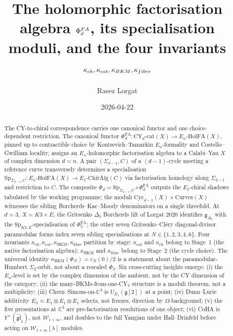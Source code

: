 \documentclass[11pt]{amsart}
\title{The holomorphic factorisation algebra $\PhiFA_d$, its
specialisation moduli, and the four invariants
$\kch,\kcat,\kBKM,\kfib$}
\author{Raeez Lorgat}
\date{2026-04-22}
\providecommand{\C}{\mathbb{C}}
\providecommand{\g}{\mathfrak{g}}
\providecommand{\gDelta}{\mathfrak{g}_{\Delta_5}}
\providecommand{\gghone}{\widehat{\mathfrak{gl}}_1}
\providecommand{\Winf}{\mathcal{W}_{1+\infty}}
\providecommand{\HolFA}{\mathrm{HolFA}}
\providecommand{\ChirAlg}{\mathrm{ChirAlg}}
\providecommand{\Sp}{\mathrm{Sp}}
\providecommand{\Cyc}{\mathrm{Cyc}}
\providecommand{\Yp}{Y^{+}}
\providecommand{\Eone}{E_1}
\providecommand{\Ethree}{E_3}
\providecommand{\En}{E_n}
\providecommand{\kch}{\kappa_{\mathrm{ch}}}
\providecommand{\kcat}{\kappa_{\mathrm{cat}}}
\providecommand{\kBKM}{\kappa_{\mathrm{BKM}}}
\providecommand{\kfib}{\kappa_{\mathrm{fibre}}}
\providecommand{\Phifun}{\Phi}
\providecommand{\PhiFA}{\Phi^{\mathrm{FA}}}
\theoremstyle{plain}
\theoremstyle{definition}
\theoremstyle{remark}
\begin{document}
\maketitle

\begin{abstract}
The CY-to-chiral correspondence carries one canonical functor and one
choice-dependent restriction. The canonical functor
$\PhiFA_d:\mathrm{CY}_d\text{-cat}(X)\to\En\text{-}\HolFA(X)$, pinned up
to contractible choice by Kontsevich--Tamarkin $\En$-formality and
Costello--Gwilliam locality, assigns an $\En$-holomorphic factorisation
algebra to a Calabi--Yau $X$ of complex dimension $d=n$. A pair
$(\Sigma_{d-1}, C)$ of a $(d-1)$-cycle meeting a reference curve
transversely determines a specialisation
$\Sp_{\Sigma_{d-1},C}:\En\text{-}\HolFA(X)\to\Eone\text{-}\ChirAlg(C)$
via factorisation homology along $\Sigma_{d-1}$ and restriction to
$C$. The composite $\Phifun_d = \Sp_{\Sigma_{d-1},C}\circ\PhiFA_d$
outputs the $\Eone$-chiral shadows tabulated by the working programme;
the moduli $\Cyc_{d-1}(X)\times\mathrm{Curves}(X)$ witnesses the
sibling Borcherds--Kac--Moody denominators on a single threefold. At
$d=3,\, X=K3\times E$, the Gritsenko $\Delta_5$ Borcherds lift of
Lorgat 2020 identifies $\gDelta$ with the $\Sp_{K3,E}$-specialisation
of $\PhiFA_3$; the other seven Gritsenko--Cl\'ery diagonal-divisor
paramodular forms index seven sibling specialisations at
$N\in\{1,2,3,4,6\}$. Four invariants $\kch,\kcat,\kBKM,\kfib$
partition by stage: $\kcat$ and $\kch$ belong to Stage~1 (the native
factorisation algebra); $\kBKM$ and $\kfib$ belong to Stage~2 (the
cycle choice).
The universal identity
$\kBKM(\Phi_N) = c_N(0)/2$ is a statement about the
paramodular-Humbert $\Sigma_2$-orbit, not about a rescaled $\Phi_3$.
Six cross-cutting insights emerge: (i) the $\En$-level is set by the
complex dimension of the ambient, not by the CY dimension of the
category; (ii) the many-BKMs-from-one-CY$_3$ structure is a moduli
theorem, not a multiplicity; (iii) Chern--Simons-on-$\C^3$ is
$U_{\Ethree}(\g[2])$ at a point; (iv) Dunn--Lurie additivity
$\Ethree\simeq\Eone\otimes\Eone\otimes\Eone$ selects, not freezes,
direction by $\Omega$-background; (v) the five presentations at $\C^3$
are pre-factorisation resolutions of one object; (vi) CoHA is
$\Yp(\gghone)$, not $\Winf$, and doubles to the full Yangian under
Hall--Drinfeld before acting on $\Winf[\lambda]$ modules.
\end{abstract}

\tableofcontents
\end{document}

